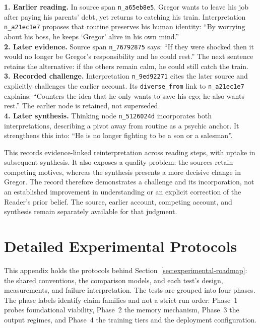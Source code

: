 \documentclass[11pt]{article}
\begin{document}
\begin{compactmetabox}
\textbf{1. Earlier reading.} In source span \texttt{n\_a65eb8e5}, Gregor wants
to leave his job after paying his parents' debt, yet returns to catching his
train. Interpretation \texttt{n\_a21ec1e7} proposes that routine preserves his
human identity: ``By worrying about his boss, he keeps `Gregor' alive in his
own mind.''\\[0.5em]
\textbf{2. Later evidence.} Source span \texttt{n\_76792875} says: ``If they
were shocked then it would no longer be Gregor's responsibility and he could
rest.'' The next sentence retains the alternative: if the others remain calm,
he could still catch the train.\\[0.5em]
\textbf{3. Recorded challenge.} Interpretation \texttt{n\_9ed92271} cites the
later source and explicitly challenges the earlier account. Its
\texttt{diverse\_from} link to \texttt{n\_a21ec1e7} explains: ``Counters the idea
that he only wants to save his ego; he also wants rest.'' The earlier node is
retained, not superseded.\\[0.5em]
\textbf{4. Later synthesis.} Thinking node \texttt{n\_5126024d} incorporates
both interpretations, describing a pivot away from routine as a psychic anchor.
It strengthens this into: ``He is no longer fighting to be a son or a salesman''.
\end{compactmetabox}

This records evidence-linked reinterpretation across reading steps, with
uptake in subsequent synthesis. It also exposes a quality problem: the sources
retain competing motives, whereas the synthesis presents a more decisive
change in Gregor. The record therefore demonstrates a challenge and its
incorporation, not an established improvement in understanding or an explicit
correction of the Reader's prior belief. The source, earlier account, competing
account, and synthesis remain separately available for that judgment.


\section{Detailed Experimental Protocols}\label{app:protocols}

This appendix holds the protocols behind
Section~\ref{sec:experimental-roadmap}: the shared conventions, the comparison
models, and each test's design, measurements, and failure interpretation. The
tests are grouped into four phases. The phase labels identify claim families
and not a strict run order: Phase~1 probes foundational viability, Phase~2 the
memory mechanism, Phase~3 the output regimes, and Phase~4 the training tiers
and the deployment configuration.
\end{document}
